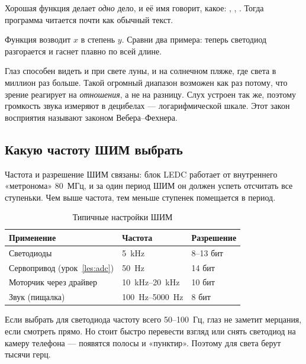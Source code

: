 \begin{tip}
Хорошая функция делает \emph{одно} дело, и её имя говорит, какое: , ,
. Тогда программа читается почти как обычный текст.
\end{tip}


Функция  возводит $x$ в степень $y$. Сравни два примера: теперь светодиод
разгорается и гаснет плавно по всей длине.

\begin{fact}
Глаз способен видеть и при свете луны, и на солнечном пляже, где света в миллион раз больше. Такой
огромный диапазон возможен как раз потому, что зрение реагирует на \emph{отношения}, а не на разницу.
Слух устроен так же, поэтому громкость звука измеряют в децибелах --- логарифмической шкале.
Этот закон восприятия называют законом Вебера--Фехнера.
\end{fact}


\subsection{Какую частоту ШИМ выбрать}

Частота и разрешение ШИМ связаны: блок LEDC работает от внутреннего «метронома» 80~МГц, и за один
период ШИМ он должен успеть отсчитать все ступеньки. Чем выше частота, тем меньше ступенек помещается
в период.

\begin{table}[H]
\centering\small
\begin{tabular}{@{}lll@{}}
\toprule
Применение & Частота & Разрешение \\
\midrule
Светодиоды & \SI{5}{kHz} & 8--13 бит \\
Сервопривод (урок~\ref{les:adc}) & \SI{50}{Hz} & 14 бит \\
Моторчик через драйвер & \SIrange{10}{20}{kHz} & 10 бит \\
Звук (пищалка) & \SIrange{100}{5000}{Hz} & 8 бит \\
\bottomrule
\end{tabular}
\caption{Типичные настройки ШИМ}
\end{table}

\begin{tip}
Если выбрать для светодиода частоту всего 50--100~Гц, глаз не заметит мерцания, если смотреть прямо.
Но стоит быстро перевести взгляд или снять светодиод на камеру телефона --- появятся полосы и «пунктир».
Поэтому для света берут тысячи герц.
\end{tip}


